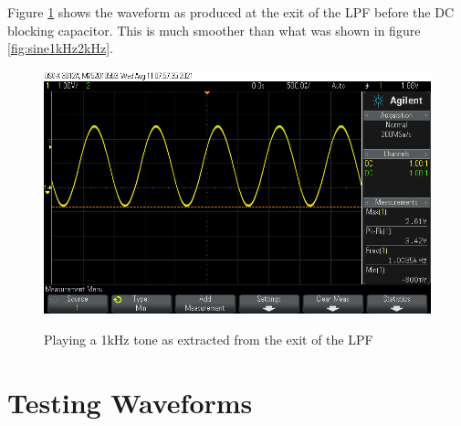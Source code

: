 \documentclass[12pt, a4paper]{article}
\begin{document}
Figure \ref{fig:VerySmooth} shows the waveform as produced at the exit of the LPF before the DC blocking capacitor. This is much smoother than what was shown in figure \ref{fig:sine1kHz2kHz}.
\begin{figure}[!htb]
	\hfill\includegraphics[width=\textwidth]{./Figures/Waveforms/LC_Filtered_Sinewave (2)}\hspace{\fill}
	\label{fig:VerySmooth}
	\caption{Playing a 1kHz tone as extracted from the exit of the LPF}
\end{figure}

\section{Testing Waveforms}
\end{document}
